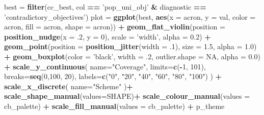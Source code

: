 \documentclass[]{book}
\newenvironment{Shaded}{\begin{snugshade}}{\end{snugshade}}
\newcommand{\DataTypeTok}[1]{\textcolor[rgb]{0.13,0.29,0.53}{#1}}
\newcommand{\DecValTok}[1]{\textcolor[rgb]{0.00,0.00,0.81}{#1}}
\newcommand{\FloatTok}[1]{\textcolor[rgb]{0.00,0.00,0.81}{#1}}
\newcommand{\KeywordTok}[1]{\textcolor[rgb]{0.13,0.29,0.53}{\textbf{#1}}}
\newcommand{\NormalTok}[1]{#1}
\newcommand{\OperatorTok}[1]{\textcolor[rgb]{0.81,0.36,0.00}{\textbf{#1}}}
\newcommand{\OtherTok}[1]{\textcolor[rgb]{0.56,0.35,0.01}{#1}}
\newcommand{\StringTok}[1]{\textcolor[rgb]{0.31,0.60,0.02}{#1}}
\begin{document}
\begin{Shaded}
\begin{Highlighting}[]
\NormalTok{best =}\StringTok{ }\KeywordTok{filter}\NormalTok{(cc_best, col }\OperatorTok{==}\StringTok{ 'pop_uni_obj'} \OperatorTok{&}\StringTok{ }\NormalTok{diagnostic }\OperatorTok{==}\StringTok{ 'contradictory_objectives'}\NormalTok{)}
\NormalTok{plot =}\StringTok{ }\KeywordTok{ggplot}\NormalTok{(best, }\KeywordTok{aes}\NormalTok{(}\DataTypeTok{x =}\NormalTok{ acron, }\DataTypeTok{y =}\NormalTok{ val, }\DataTypeTok{color =}\NormalTok{ acron, }\DataTypeTok{fill =}\NormalTok{ acron, }\DataTypeTok{shape =}\NormalTok{ acron)) }\OperatorTok{+}
\StringTok{  }\KeywordTok{geom_flat_violin}\NormalTok{(}\DataTypeTok{position =} \KeywordTok{position_nudge}\NormalTok{(}\DataTypeTok{x =} \FloatTok{.2}\NormalTok{, }\DataTypeTok{y =} \DecValTok{0}\NormalTok{), }\DataTypeTok{scale =} \StringTok{'width'}\NormalTok{, }\DataTypeTok{alpha =} \FloatTok{0.2}\NormalTok{) }\OperatorTok{+}
\StringTok{  }\KeywordTok{geom_point}\NormalTok{(}\DataTypeTok{position =} \KeywordTok{position_jitter}\NormalTok{(}\DataTypeTok{width =} \FloatTok{.1}\NormalTok{), }\DataTypeTok{size =} \FloatTok{1.5}\NormalTok{, }\DataTypeTok{alpha =} \FloatTok{1.0}\NormalTok{) }\OperatorTok{+}
\StringTok{  }\KeywordTok{geom_boxplot}\NormalTok{(}\DataTypeTok{color =} \StringTok{'black'}\NormalTok{, }\DataTypeTok{width =} \FloatTok{.2}\NormalTok{, }\DataTypeTok{outlier.shape =} \OtherTok{NA}\NormalTok{, }\DataTypeTok{alpha =} \FloatTok{0.0}\NormalTok{) }\OperatorTok{+}
\StringTok{  }\KeywordTok{scale_y_continuous}\NormalTok{(}
    \DataTypeTok{name=}\StringTok{"Coverage"}\NormalTok{,}
    \DataTypeTok{limits=}\KeywordTok{c}\NormalTok{(}\OperatorTok{-}\DecValTok{1}\NormalTok{, }\DecValTok{101}\NormalTok{),}
    \DataTypeTok{breaks=}\KeywordTok{seq}\NormalTok{(}\DecValTok{0}\NormalTok{,}\DecValTok{100}\NormalTok{, }\DecValTok{20}\NormalTok{),}
    \DataTypeTok{labels=}\KeywordTok{c}\NormalTok{(}\StringTok{"0"}\NormalTok{, }\StringTok{"20"}\NormalTok{, }\StringTok{"40"}\NormalTok{, }\StringTok{"60"}\NormalTok{, }\StringTok{"80"}\NormalTok{, }\StringTok{"100"}\NormalTok{)}
\NormalTok{  ) }\OperatorTok{+}
\StringTok{  }\KeywordTok{scale_x_discrete}\NormalTok{(}
    \DataTypeTok{name=}\StringTok{"Scheme"}
\NormalTok{  )}\OperatorTok{+}
\StringTok{  }\KeywordTok{scale_shape_manual}\NormalTok{(}\DataTypeTok{values=}\NormalTok{SHAPE)}\OperatorTok{+}
\StringTok{  }\KeywordTok{scale_colour_manual}\NormalTok{(}\DataTypeTok{values =}\NormalTok{ cb_palette) }\OperatorTok{+}
\StringTok{  }\KeywordTok{scale_fill_manual}\NormalTok{(}\DataTypeTok{values =}\NormalTok{ cb_palette) }\OperatorTok{+}
\StringTok{  }\NormalTok{p_theme}


\end{Highlighting}
\end{Shaded}
\end{document}
